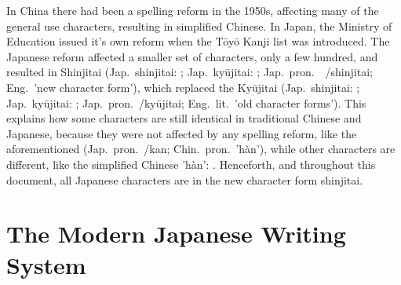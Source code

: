 In China there had been a spelling reform in the 1950s, affecting many of the
general use characters, resulting in simplified Chinese. In Japan, the Ministry
of Education issued it's own reform when the Tōyō Kanji list was introduced.
The Japanese reform affected a smaller set of characters, only a few 
hundred, and resulted in Shinjitai (Jap.~shinjitai: ; 
Jap.~kyūjitai: ;
Jap.~pron.　/shinjitai; Eng.~'new character form'), 
which replaced the Kyūjitai 
(Jap.~shinjitai: ; Jap.~kyūjitai: ; 
Jap.~pron.~/kyūjitai; Eng.~lit.~'old character forms'). 
This explains how some characters are still identical in traditional Chinese and 
Japanese, because they were not affected by any spelling reform, like the 
aforementioned  (Jap.~pron.~/kan; Chin.~pron.~'hàn'),
while other characters are different, like the simplified 
Chinese 'hàn': . Henceforth, and throughout this document, all Japanese characters are in the new character form shinjitai.

\section{The Modern Japanese Writing System}
\label{sec:modernjapanesewritingsystem}


